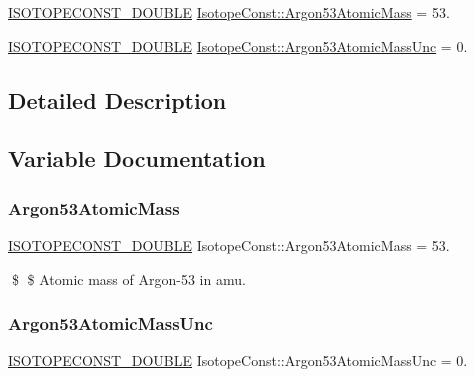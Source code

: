 \begin{DoxyCompactItemize}
\item 
\mbox{\hyperlink{group___isotope_const-_macros_ga8f45a7272ce02c0b4c65c44636ed719a}{I\+S\+O\+T\+O\+P\+E\+C\+O\+N\+S\+T\+\_\+\+D\+O\+U\+B\+LE}} \mbox{\hyperlink{group___isotope_const-_argon-_ar53_ga5dd6a3ae31f34becd819c18b3de31af5}{Isotope\+Const\+::\+Argon53\+Atomic\+Mass}} = 53.
\item 
\mbox{\hyperlink{group___isotope_const-_macros_ga8f45a7272ce02c0b4c65c44636ed719a}{I\+S\+O\+T\+O\+P\+E\+C\+O\+N\+S\+T\+\_\+\+D\+O\+U\+B\+LE}} \mbox{\hyperlink{group___isotope_const-_argon-_ar53_ga4f36ba5ae790251393a59c0f275eeb0b}{Isotope\+Const\+::\+Argon53\+Atomic\+Mass\+Unc}} = 0.
\end{DoxyCompactItemize}


\subsection{Detailed Description}


\subsection{Variable Documentation}
\mbox{\label{group___isotope_const-_argon-_ar53_ga5dd6a3ae31f34becd819c18b3de31af5}} 
\subsubsection{\texorpdfstring{Argon53\+Atomic\+Mass}{Argon53AtomicMass}}
{\footnotesize\ttfamily \mbox{\hyperlink{group___isotope_const-_macros_ga8f45a7272ce02c0b4c65c44636ed719a}{I\+S\+O\+T\+O\+P\+E\+C\+O\+N\+S\+T\+\_\+\+D\+O\+U\+B\+LE}} Isotope\+Const\+::\+Argon53\+Atomic\+Mass = 53.}

\$ \$ Atomic mass of Argon-\/53 in amu. \mbox{\label{group___isotope_const-_argon-_ar53_ga4f36ba5ae790251393a59c0f275eeb0b}} 
\subsubsection{\texorpdfstring{Argon53\+Atomic\+Mass\+Unc}{Argon53AtomicMassUnc}}
{\footnotesize\ttfamily \mbox{\hyperlink{group___isotope_const-_macros_ga8f45a7272ce02c0b4c65c44636ed719a}{I\+S\+O\+T\+O\+P\+E\+C\+O\+N\+S\+T\+\_\+\+D\+O\+U\+B\+LE}} Isotope\+Const\+::\+Argon53\+Atomic\+Mass\+Unc = 0.}

